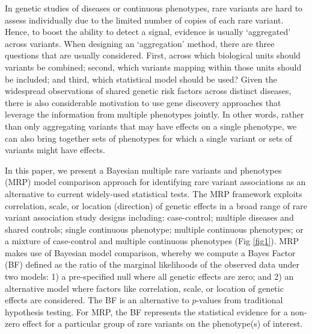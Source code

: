 In genetic studies of diseases or continuous phenotypes, rare variants are hard to assess individually due to the limited number of copies of each rare variant. Hence, to boost the ability to detect a signal, evidence is usually `aggregated' across variants. When designing an `aggregation' method, there are three questions that are usually considered. First, across which biological units should variants be combined; second, which variants mapping within those units should be included\cite{majithia2014rare}; and third, which statistical model should be used\cite{lee2014rare}? Given the widespread observations of shared genetic risk factors across distinct diseases, there is also considerable motivation to use gene discovery approaches that leverage the information from multiple phenotypes jointly. In other words, rather than only aggregating variants that may have effects on a single phenotype, we can also bring together sets of phenotypes for which a single variant or sets of variants might have effects. 

In this paper, we present a Bayesian multiple rare variants and phenotypes (MRP) model comparison approach for identifying rare variant associations as an alternative to current widely-used statistical tests. The MRP framework exploits correlation, scale, or location (direction) of genetic effects in a broad range of rare variant association study designs including: case-control; multiple diseases and shared controls; single continuous phenotype; multiple continuous phenotypes; or a mixture of case-control and multiple continuous phenotypes (Fig \ref{fig1}). MRP makes use of Bayesian model comparison, whereby we compute a Bayes Factor (BF) defined as the ratio of the marginal likelihoods of the observed data under two models: 1) a pre-specified null where all genetic effects are zero; and 2) an alternative model where factors like correlation, scale, or location of genetic effects are considered. The BF is an alternative to $p$-values from traditional hypothesis testing. For MRP, the BF represents the statistical evidence for a non-zero effect for a particular group of rare variants on the phenotype(s) of interest.

